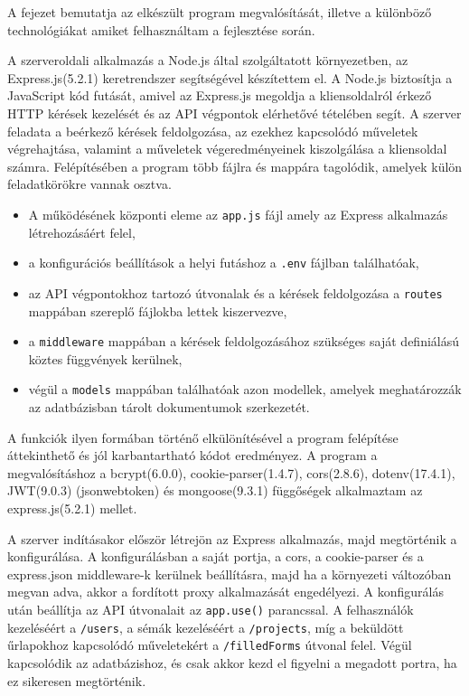 
A fejezet bemutatja az elkészült program megvalósítását, illetve a különböző technológiákat amiket felhasználtam a fejlesztése során.


A szerveroldali alkalmazás a Node.js által szolgáltatott környezetben, az Express.js(5.2.1) keretrendszer segítségével készítettem el. A Node.js biztosítja a JavaScript kód futását, amivel az Express.js megoldja a kliensoldalról érkező HTTP kérések kezelését és az API végpontok elérhetővé tételében segít. A szerver feladata a beérkező kérések feldolgozása, az ezekhez kapcsolódó műveletek végrehajtása, valamint a műveletek végeredményeinek kiszolgálása a kliensoldal számra. 
Felépítésében a program több fájlra és mappára tagolódik, amelyek külön feladatkörökre vannak osztva.
\begin{itemize}
\item A működésének központi eleme az \texttt{app.js} fájl amely az Express alkalmazás létrehozásáért felel,
\item a konfigurációs beállítások a helyi futáshoz a \texttt{.env} fájlban találhatóak,
\item az API végpontokhoz tartozó útvonalak és a kérések feldolgozása a \texttt{routes} mappában szereplő fájlokba lettek kiszervezve,
\item a \texttt{middleware} mappában a kérések feldolgozásához szükséges saját definiálású köztes függvények kerülnek,
\item végül a \texttt{models} mappában találhatóak azon modellek, amelyek meghatározzák az adatbázisban tárolt dokumentumok szerkezetét. 
\end{itemize}
A funkciók ilyen formában történő elkülönítésével a program felépítése áttekinthető és jól karbantartható kódot eredményez. A program a megvalósításhoz a bcrypt(6.0.0), cookie-parser(1.4.7), cors(2.8.6), dotenv(17.4.1), JWT(9.0.3) (jsonwebtoken) és mongoose(9.3.1) függőségek alkalmaztam az express.js(5.2.1) mellet.

A szerver indításakor először létrejön az Express alkalmazás, majd megtörténik a konfigurálása. A konfigurálásban a saját portja, a cors, a cookie-parser és a express.json middleware-k kerülnek beállításra, majd ha a környezeti változóban megvan adva, akkor a fordított proxy alkalmazását engedélyezi. A konfigurálás után beállítja az API útvonalait az \texttt{app.use()} parancssal. A felhasználók kezeléséért a \texttt{/users}, a sémák kezeléséért a \texttt{/projects}, míg a beküldött űrlapokhoz kapcsolódó műveletekért a \texttt{/filledForms} útvonal felel. Végül kapcsolódik az adatbázishoz, és csak akkor kezd el figyelni a megadott portra, ha ez sikeresen megtörténik.

